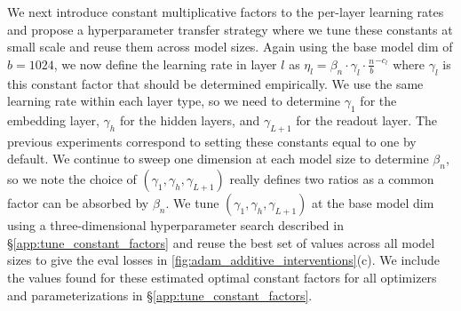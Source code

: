 \documentclass{article}
\newcommand{\sref}[1]{\S\ref{#1}}
\theoremstyle{plain}
\theoremstyle{definition}
\theoremstyle{remark}
\begin{document}
We next introduce constant multiplicative factors to the per-layer learning rates and propose a hyperparameter transfer strategy where we tune these constants at small scale and reuse them across model sizes. Again using the base model dim of $b = 1024$, we now define the learning rate in layer $l$ as $\eta_l = \beta_n \cdot \gamma_l \cdot \frac{n}{b} ^ {-c_l}$ where $\gamma_l$ is this constant factor that should be determined empirically. We use the same learning rate within each layer type, so we need to determine $\gamma_1$ for the embedding layer, $\gamma_h$ for the hidden layers, and $\gamma_{L+1}$ for the readout layer. The previous experiments correspond to setting these constants equal to one by default. We continue to sweep one dimension at each model size to determine $\beta_n$, so we note the choice of $(\gamma_1, \gamma_h, \gamma_{L+1})$ really defines two ratios as a common factor can be absorbed by $\beta_n$. We tune $(\gamma_1, \gamma_h, \gamma_{L+1})$ at the base model dim using a three-dimensional hyperparameter search described in \sref{app:tune_constant_factors} and reuse the best set of values across all model sizes to give the eval losses in \cref{fig:adam_additive_interventions}(c). We include the values found for these estimated optimal constant factors for all optimizers and parameterizations in \sref{app:tune_constant_factors}.
\end{document}
